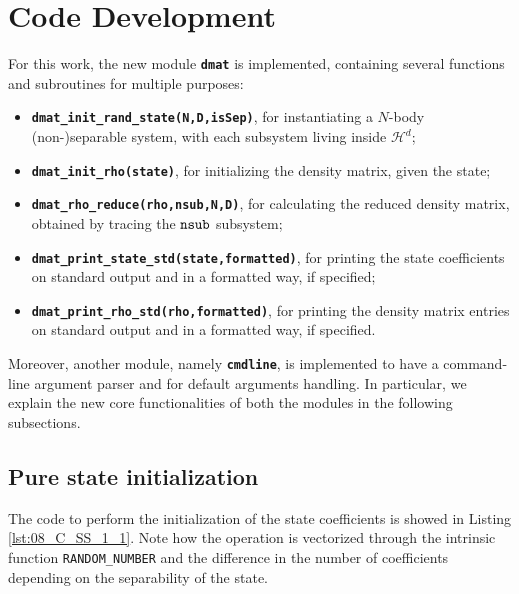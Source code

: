 \documentclass[pra, onecolumn, notitlepage, floats, 11pt]{revtex4-1}
\newcommand{\codebold}[2][cobalt]{\texttt{\bfseries {\color{#1}#2}}}
\newcommand{\code}[2][black]{\color{#1}\texttt{#2}}
\newcommand{\codefunctionbold}[2]{\texttt{\bfseries {\color{cobalt}#1}({\color{lava}#2})}}
\begin{document}
\section{Code Development}
For this work, the new module \codebold{dmat} is implemented, containing several functions and subroutines for multiple purposes:
\vspace{-5pt}
\begin{itemize}%
    \setlength\itemsep{-3pt}
    \item \codefunctionbold{dmat\_init\_rand\_state}{N,D,isSep}, for instantiating a \( N \)-body (non-)separable system, with each subsystem living inside \( \mathcal{H}^{d} \);
    \item \codefunctionbold{dmat\_init\_rho}{state}, for initializing the density matrix, given the state;
    \item \codefunctionbold{dmat\_rho\_reduce}{rho,nsub,N,D}, for calculating the reduced density matrix, obtained by tracing the \( \code{nsub} \) subsystem;
    \item \codefunctionbold{dmat\_print\_state\_std}{state,formatted}, for printing the state coefficients on standard output and in a formatted way, if specified;
    \item \codefunctionbold{dmat\_print\_rho\_std}{rho,formatted}, for printing the density matrix entries on standard output and in a formatted way, if specified.
\end{itemize}

Moreover, another module, namely \codebold{cmdline}, is implemented to have a command-line argument parser and for default arguments handling. In particular, we explain the new core functionalities of both the modules in the following subsections.



\subsection{Pure state initialization}
The code to perform the initialization of the state coefficients is showed in Listing \ref{lst:08_C_SS_1_1}. Note how the operation is vectorized through the intrinsic function \code{RANDOM\_NUMBER} and the difference in the number of coefficients depending on the separability of the state.
\end{document}
